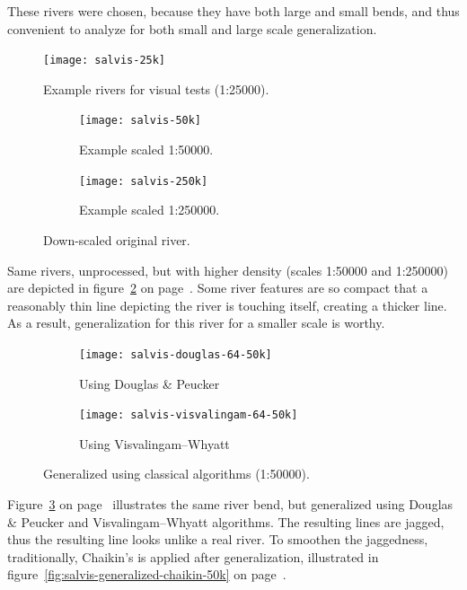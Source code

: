 \documentclass[a4paper]{article}
\newcommand{\onpage}[1]{\ref{#1} on page~\pageref{#1}}
\newcommand{\DP}{Douglas \& Peucker}
\newcommand{\VW}{Visvalingam--Whyatt}
\begin{document}
These rivers were chosen, because they have both large and small bends, and
thus convenient to analyze for both small and large scale generalization.

\begin{figure}[h]
    \centering
    \texttt{[image: salvis-25k]}
    \caption{Example rivers for visual tests (1:25000).}
    \label{fig:salvis-25}
\end{figure}

\begin{figure}[h]
    \centering
    \begin{subfigure}[b]{.49\textwidth}
        \texttt{[image: salvis-50k]}
        \caption{Example scaled 1:50000.}
    \end{subfigure}
    \hfill
    \begin{subfigure}[b]{.49\textwidth}
        \centering
        \texttt{[image: salvis-250k]}
        \caption{Example scaled 1:250000.}
    \end{subfigure}
    \caption{Down-scaled original river.}
    \label{fig:salvis-50-250}
\end{figure}

Same rivers, unprocessed, but with higher density (scales 1:50000 and 1:250000)
are depicted in figure~\onpage{fig:salvis-50-250}. Some river features are so
compact that a reasonably thin line depicting the river is touching itself,
creating a thicker line. As a result, generalization for this river for a
smaller scale is worthy.

\begin{figure}[h]
    \centering
    \begin{subfigure}[b]{.49\textwidth}
        \texttt{[image: salvis-douglas-64-50k]}
        \caption{Using {\DP}}
    \end{subfigure}
    \hfill
    \begin{subfigure}[b]{.49\textwidth}
        \texttt{[image: salvis-visvalingam-64-50k]}
        \caption{Using {\VW}}
    \end{subfigure}
    \caption{Generalized using classical algorithms (1:50000).}
    \label{fig:salvis-generalized-50k}
\end{figure}

Figure~\onpage{fig:salvis-generalized-50k} illustrates the same river bend, but
generalized using {\DP} and {\VW} algorithms. The resulting lines are jagged,
thus the resulting line looks unlike a real river. To smoothen the jaggedness,
traditionally, Chaikin's\cite{chaikin1974algorithm} is applied after
generalization, illustrated in
figure~\onpage{fig:salvis-generalized-chaikin-50k}.
\end{document}
